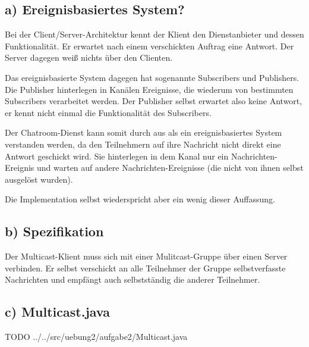 \subsection*{a) Ereignisbasiertes System?}
Bei der Client/Server-Architektur kennt der Klient den Dienstanbieter und dessen Funktionalität.
Er erwartet nach einem verschickten Auftrag eine Antwort. 
Der Server dagegen weiß nichts über den Clienten.

Das ereignisbasierte System dagegen hat sogenannte Subscribers und Publishers.
Die Publisher hinterlegen in Kanälen Ereignisse, die wiederum von bestimmten Subscribers verarbeitet werden. 
Der Publisher selbst erwartet also keine Antwort, er kennt nicht einmal die Funktionalität des Subscribers.

Der Chatroom-Dienst kann somit durch aus als ein ereignisbasiertes System verstanden werden, da den Teilnehmern auf ihre Nachricht nicht direkt eine Antwort geschickt wird. Sie hinterlegen in dem Kanal nur ein Nachrichten-Ereignis und warten auf andere Nachrichten-Ereignisse (die nicht von ihnen selbst ausgelöst wurden).

Die Implementation selbst wiederspricht aber ein wenig dieser Auffassung.

\subsection*{b) Spezifikation}
Der Multicast-Klient muss sich mit einer Mulitcast-Gruppe über einen Server verbinden.
Er selbst verschickt an alle Teilnehmer der Gruppe selbstverfasste Nachrichten und empfängt auch selbstständig die anderer Teilnehmer.

\subsection*{c) Multicast.java}
{\sf TODO}
 {../../src/uebung2/aufgabe2/Multicast.java}
